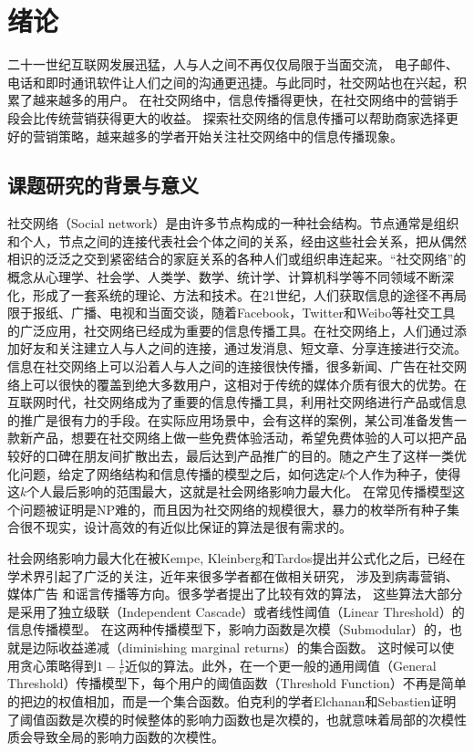 
\chapter{绪论}
二十一世纪互联网发展迅猛，人与人之间不再仅仅局限于当面交流，
电子邮件、电话和即时通讯软件让人们之间的沟通更迅捷。与此同时，社交网站也在兴起，积累了越来越多的用户。
在社交网络中，信息传播得更快，在社交网络中的营销手段会比传统营销获得更大的收益。
探索社交网络的信息传播可以帮助商家选择更好的营销策略，越来越多的学者开始关注社交网络中的信息传播现象。


\section{课题研究的背景与意义}
社交网络（Social network）是由许多节点构成的一种社会结构。节点通常是组织和个人，节点之间的连接代表社会个体之间的关系，经由这些社会关系，把从偶然相识的泛泛之交到紧密结合的家庭关系的各种人们或组织串连起来。“社交网络”的概念从心理学、社会学、人类学、数学、统计学、计算机科学等不同领域不断深化，形成了一套系统的理论、方法和技术。在21世纪，人们获取信息的途径不再局限于报纸、广播、电视和当面交谈，随着Facebook，Twitter和Weibo等社交工具的广泛应用，社交网络已经成为重要的信息传播工具。在社交网络上，人们通过添加好友和关注建立人与人之间的连接，通过发消息、短文章、分享连接进行交流。信息在社交网络上可以沿着人与人之间的连接很快传播，很多新闻、广告在社交网络上可以很快的覆盖到绝大多数用户，这相对于传统的媒体介质有很大的优势。在互联网时代，社交网络成为了重要的信息传播工具，利用社交网络进行产品或信息的推广是很有力的手段。在实际应用场景中，会有这样的案例，某公司准备发售一款新产品，想要在社交网络上做一些免费体验活动，希望免费体验的人可以把产品较好的口碑在朋友间扩散出去，最后达到产品推广的目的。随之产生了这样一类优化问题，给定了网络结构和信息传播的模型之后，如何选定$k$个人作为种子，使得这$k$个人最后影响的范围最大，这就是社会网络影响力最大化\cite{Kempe2003maximizing}。
在常见传播模型这个问题被证明是NP难的，而且因为社交网络的规模很大，暴力的枚举所有种子集合很不现实，设计高效的有近似比保证的算法是很有需求的。

社会网络影响力最大化在被Kempe, Kleinberg和Tardos\cite{Kempe2003maximizing}提出并公式化之后，已经在学术界引起了广泛的关注，近年来很多学者都在做相关研究，
涉及到病毒营销\cite{arthur2009pricing,Subramani2003knowledge,barbieri2014influence,Chen2015combining}、
媒体广告\cite{li2011labeled,bakshy2012advertising,Aslay2015viral}
和谣言传播\cite{carnes2007maximizing,kostka2008word,borodin2010competitive,he2012influence,Wang2016drimux}等方向。很多学者提出了比较有效的算法\cite{Kempe2003maximizing,Leskovec2007celf,Chen2009efficient,chen2010sharpphard,goyal2011celfplus,Goyal2011simpath,tang2014newrrset}，
这些算法大部分是采用了独立级联（Independent Cascade）或者线性阈值（Linear Threshold）\cite{Kempe2003maximizing}的信息传播模型。
在这两种传播模型下，影响力函数是次模（Submodular）的，也就是边际收益递减（diminishing marginal returns）的集合函数。
这时候可以使用贪心策略得到$1-\frac{1}{e}$近似的算法。此外，在一个更一般的通用阈值（General Threshold）\cite{Kempe2003maximizing}传播模型下，每个用户的阈值函数（Threshold Function）不再是简单的把边的权值相加，而是一个集合函数。伯克利的学者Elchanan和Sebastien\cite{Mossel2007sub}证明了阈值函数是次模的时候整体的影响力函数也是次模的，也就意味着局部的次模性质会导致全局的影响力函数的次模性。

